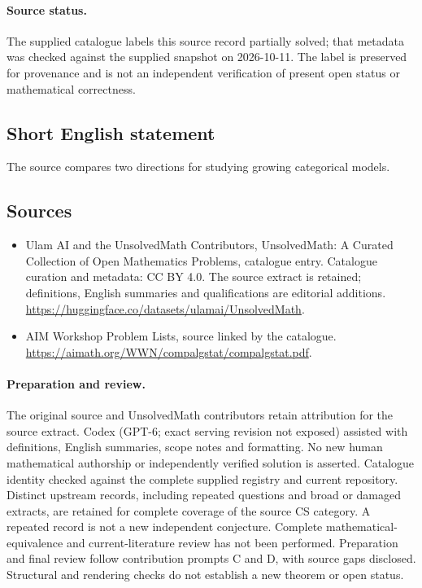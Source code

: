 \documentclass[11pt]{article}
\begin{document}
\paragraph{Source status.}
The supplied catalogue labels this source record partially solved; that metadata was checked against the supplied snapshot on 2026-10-11. The label is preserved for provenance and is not an independent verification of present open status or mathematical correctness.
\subsection{Short English statement}
The source compares two directions for studying growing categorical models.
\subsection{Sources}
\begin{itemize}
\item[\hypertarget{source:statement:1}{S1}] Ulam AI and the UnsolvedMath Contributors, UnsolvedMath: A Curated Collection of Open Mathematics Problems, catalogue entry. Catalogue curation and metadata: CC BY 4.0. The source extract is retained; definitions, English summaries and qualifications are editorial additions.
\url{https://huggingface.co/datasets/ulamai/UnsolvedMath}.
\item[\hypertarget{source:statement:2}{S2}] AIM Workshop Problem Lists, source linked by the catalogue.
\url{https://aimath.org/WWN/compalgstat/compalgstat.pdf}.
\end{itemize}
\paragraph{Preparation and review.}
The original source and UnsolvedMath contributors retain attribution for the source extract. Codex (GPT-6; exact serving revision not exposed) assisted with definitions, English summaries, scope notes and formatting. No new human mathematical authorship or independently verified solution is asserted. Catalogue identity checked against the complete supplied registry and current repository. Distinct upstream records, including repeated questions and broad or damaged extracts, are retained for complete coverage of the source CS category. A repeated record is not a new independent conjecture. Complete mathematical-equivalence and current-literature review has not been performed. Preparation and final review follow contribution prompts C and D, with source gaps disclosed. Structural and rendering checks do not establish a new theorem or open status.
\label{end:statement}
\end{document}
